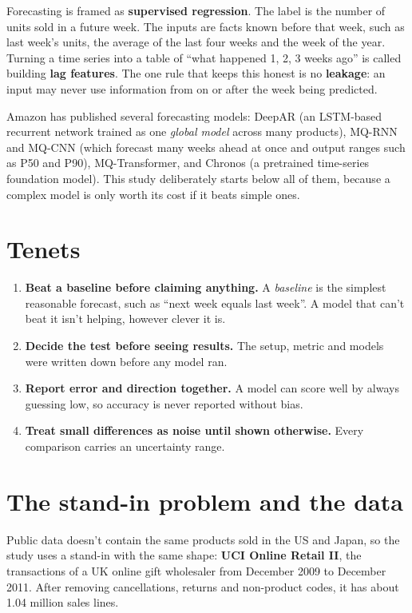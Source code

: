 \documentclass[11pt]{article}
\begin{document}
Forecasting is framed as \textbf{supervised regression}. The label is the number of units sold in a
future week. The inputs are facts known before that week, such as last week's units, the average of the
last four weeks and the week of the year. Turning a time series into a table of ``what happened 1, 2, 3
weeks ago'' is called building \textbf{lag features}. The one rule that keeps this honest is no
\textbf{leakage}: an input may never use information from on or after the week being predicted.

Amazon has published several forecasting models: DeepAR (an LSTM-based recurrent network trained as one
\emph{global model} across many products), MQ-RNN and MQ-CNN (which forecast many weeks ahead at once and
output ranges such as P50 and P90), MQ-Transformer, and Chronos (a pretrained time-series foundation
model). This study deliberately starts below all of them, because a complex model is only worth its
cost if it beats simple ones.

\section{Tenets}

\begin{enumerate}
\item \textbf{Beat a baseline before claiming anything.} A \emph{baseline} is the simplest reasonable
forecast, such as ``next week equals last week''. A model that can't beat it isn't helping, however
clever it is.
\item \textbf{Decide the test before seeing results.} The setup, metric and models were written down
before any model ran.
\item \textbf{Report error and direction together.} A model can score well by always guessing low, so
accuracy is never reported without bias.
\item \textbf{Treat small differences as noise until shown otherwise.} Every comparison carries an
uncertainty range.
\end{enumerate}

\section{The stand-in problem and the data}

Public data doesn't contain the same products sold in the US and Japan, so the study uses a stand-in with
the same shape: \textbf{UCI Online Retail II}, the transactions of a UK online gift wholesaler from
December 2009 to December 2011. After removing cancellations, returns and non-product codes, it has about
1.04 million sales lines.
\end{document}
